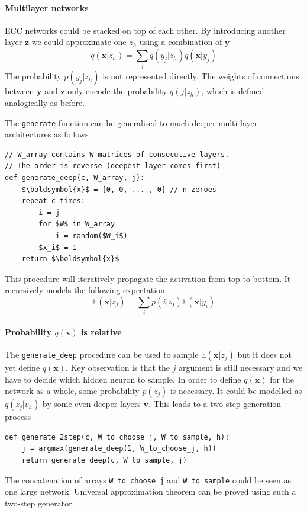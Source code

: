 \documentclass[12pt]{article}
\begin{document}
\paragraph{Multilayer networks}
ECC networks could be stacked on top of each other. By introducing another layer $\boldsymbol{z}$ we could approximate one $z_h$ using a combination of   $\boldsymbol{y}$
\[
q(\boldsymbol{x}|z_h) = \sum_{j} q(y_j|z_h) q(\boldsymbol{x}|y_j)
\] 
The probability $p(y_j|z_h)$ is not represented directly. The weights of connections between $\boldsymbol{y}$ and $\boldsymbol{z}$ only encode the probability $q(j|z_h)$, which is defined analogically as before. 

The \texttt{generate} function can be generalised to much deeper multi-layer architectures as follows
\begin{lstlisting}
// W_array contains W matrices of consecutive layers.
// The order is reverse (deepest layer comes first)
def generate_deep(c, W_array, j):
    $\boldsymbol{x}$ = [0, 0, ... , 0] // n zeroes
    repeat c times:
        i = j
        for $W$ in W_array
            i = random($W_i$)
        $x_i$ = 1
    return $\boldsymbol{x}$
\end{lstlisting}
This procedure will iteratively propagate the activation from top to bottom. It recursively models the following expectation
\[
\mathbb{E}(\boldsymbol{x}|z_j) = \sum_{i} p(i|z_j) \mathbb{E}(\boldsymbol{x}|y_i)
\] 
\paragraph{Probability $q(\boldsymbol{x})$ is relative} The \texttt{generate\_deep} procedure can be used to sample $\mathbb{E}(\boldsymbol{x}|z_j)$ but it does not yet define $q(\boldsymbol{x})$. Key observation is that the $j$ argument is still necessary and we have to decide which hidden neuron to sample. In order to define $q(\boldsymbol{x})$ for the network as a whole, some probability $p(z_j)$ is necessary. It could be modelled as $q(z_j|v_h)$ by some even deeper layers $\boldsymbol{v}$. This leads to a two-step generation process
\begin{lstlisting}
def generate_2step(c, W_to_choose_j, W_to_sample, h):
    j = argmax(generate_deep(1, W_to_choose_j, h))
    return generate_deep(c, W_to_sample, j)
\end{lstlisting}
The concatenation of arrays \texttt{W\_to\_choose\_j} and  \texttt{W\_to\_sample} could be seen as one large network. Universal approximation theorem can be proved using such a two-step generator
\end{document}
